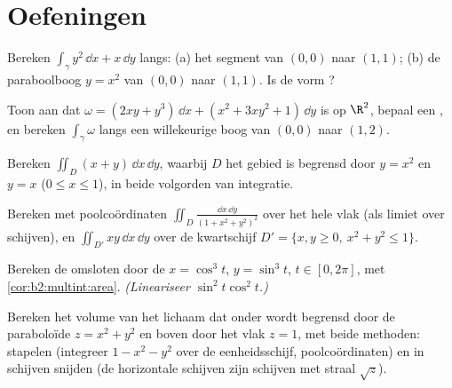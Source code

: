 \section{Oefeningen}

\begin{exercise}[$\star$]\label{exo:b2:multint:1}
Bereken $\int_\gamma y^2\,\dd x + x\,\dd y$ langs: (a) het segment
van $(0,0)$ naar $(1,1)$; (b) de paraboolboog $y = x^2$ van $(0,0)$
naar $(1,1)$. Is de vorm ?
\end{exercise}

\begin{exercise}[$\star$]\label{exo:b2:multint:2}
Toon aan dat $\omega = (2xy + y^3)\,\dd x + (x^2 + 3xy^2 + 1)\,\dd
y$  is op $\R^2$, bepaal een , en bereken
$\int_\gamma\omega$ langs een willekeurige boog van $(0, 0)$ naar
$(1, 2)$.
\end{exercise}

\begin{exercise}[$\star$]\label{exo:b2:multint:3}
Bereken $\iint_D (x + y)\,\dd x\,\dd y$, waarbij $D$ het gebied is
begrensd door $y = x^2$ en $y = x$ ($0 \leq x \leq 1$), in beide
volgorden van integratie.
\end{exercise}

\begin{exercise}[$\star\star$]\label{exo:b2:multint:4}
Bereken met poolcoördinaten $\iint_D \frac{\dd x\,\dd y}{(1 + x^2 +
y^2)^2}$ over het hele vlak (als limiet over schijven), en
$\iint_{D'} xy\,\dd x\,\dd y$ over de kwartschijf $D' = \{x, y \geq
0,\ x^2 + y^2 \leq 1\}$.
\end{exercise}

\begin{exercise}[$\star\star$]\label{exo:b2:multint:5}
Bereken de  omsloten door de  $x = \cos^3 t$, $y
= \sin^3 t$, $t \in [0, 2\pi]$, met \cref{cor:b2:multint:area}.
\emph{(Lineariseer $\sin^2 t\cos^2 t$.)}
\end{exercise}

\begin{exercise}[$\star\star$]\label{exo:b2:multint:6}
Bereken het volume van het lichaam dat onder wordt begrensd door de
paraboloïde $z = x^2 + y^2$ en boven door het vlak $z = 1$, met
beide methoden: stapelen (integreer $1 - x^2 - y^2$ over de
eenheidsschijf, poolcoördinaten) en in schijven snijden (de
horizontale schijven zijn schijven met straal $\sqrt z$).
\end{exercise}

